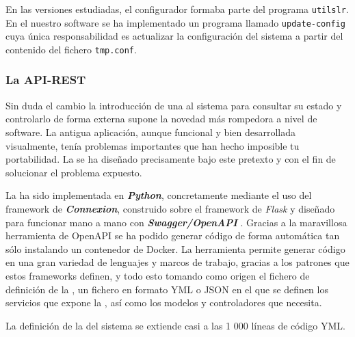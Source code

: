 En las versiones estudiadas, el configurador formaba parte del programa \texttt{utilslr}. En el nuestro software se ha implementado un programa llamado \texttt{update-config} cuya única responsabilidad es actualizar la configuración del sistema a partir del contenido del fichero \texttt{tmp.conf}.

\subsubsection{La API-REST}

Sin duda el cambio la introducción de una  al sistema para consultar su estado y controlarlo de forma externa supone la novedad más rompedora a nivel de software. La antigua aplicación, aunque funcional y bien desarrollada visualmente, tenía problemas importantes que han hecho imposible tu portabilidad. La  se ha diseñado precisamente bajo este pretexto y con el fin de solucionar el problema expuesto.

La  ha sido implementada en \textbf{\textit{Python}}, concretamente mediante el uso del framework de \textbf{\textit{Connexion}}, construido sobre el framework de \textit{Flask} y diseñado para funcionar mano a mano con \textbf{\textit{Swagger/OpenAPI}} \cite{swagger}. Gracias a la maravillosa herramienta de OpenAPI \cite{openapi} se ha podido generar código de forma automática tan sólo instalando un contenedor de Docker. La herramienta permite generar código en una gran variedad de lenguajes y marcos de trabajo, gracias a los patrones que estos frameworks definen, y todo esto tomando como origen el fichero de definición de la , un fichero en formato YML o \acrshort{JSON} en el que se definen los servicios que expone la , así como los modelos y controladores que necesita.

La definición de la  del sistema se extiende casi a las 1 000 líneas de código YML. \newpage

